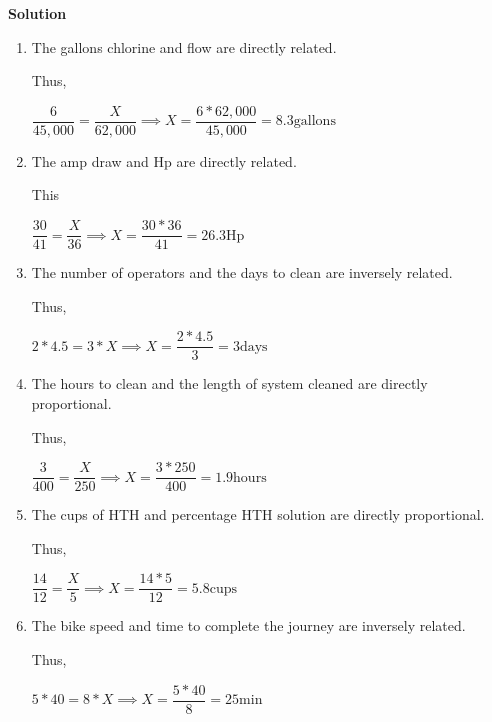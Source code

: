 \textbf{Solution}
\begin{enumerate}
\item The gallons chlorine and flow are directly related. 

Thus,

$\dfrac{6}{45,000}=\dfrac{X}{62,000} \implies X=\dfrac{6*62,000}{45,000}=8.3 \mathrm{gallons}$


\vspace{0.25cm}

\item The amp draw and Hp are directly related.

This

$\dfrac{30}{41}=\dfrac{X}{36} \implies X=\dfrac{30*36}{41}=26.3 \mathrm{Hp}$

\vspace{0.25cm}

\item The number of operators and the days to clean are inversely related.

Thus,

$2 * 4.5 = 3*X \implies X = \dfrac{2*4.5}{3} = 3 \mathrm{days}$



\vspace{0.25cm}

\item The hours to clean and the length of system cleaned are directly proportional.

Thus,

$\dfrac{3}{400}=\dfrac{X}{250} \implies X=\dfrac{3*250}{400}=1.9 \mathrm{hours}$

\vspace{0.25cm}

\item The cups of HTH and percentage HTH solution are directly proportional.

Thus,

$\dfrac{14}{12}=\dfrac{X}{5} \implies X=\dfrac{14*5}{12}=5.8 \mathrm{cups}$

\vspace{0.3cm}

\item The bike speed and time to complete the journey are inversely related.

Thus,

$5 * 40 = 8*X \implies X = \dfrac{5*40}{8} = 25 \mathrm{min}$

\end{enumerate}

\vspace{1cm}
